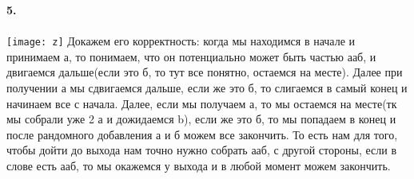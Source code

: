 \documentclass[a4paper,12pt]{article}
\begin{document}
\textbf{5.}\\\\
\texttt{[image: z]}
Докажем его корректность: когда мы находимся в начале и принимаем а, то понимаем, что он потенциально может быть частью ааб, и двигаемся дальше(если это б, то тут все понятно, остаемся на месте). Далее при получении а мы сдвигаемся дальше, если же это б, то слигаемся в самый конец и начинаем все с начала. Далее, если мы получаем а, то мы остаемся на месте(тк мы собрали уже 2 а и дожидаемся b), если же это б, то мы попадаем в конец и после рандомного добавления а и б можем все закончить. То есть нам для того, чтобы дойти до выхода нам точно нужно собрать ааб, с другой стороны, если в слове есть ааб, то мы окажемся у выхода и в любой момент можем закончить.\\
\begin{center} 
\end{center}
\end{document}
